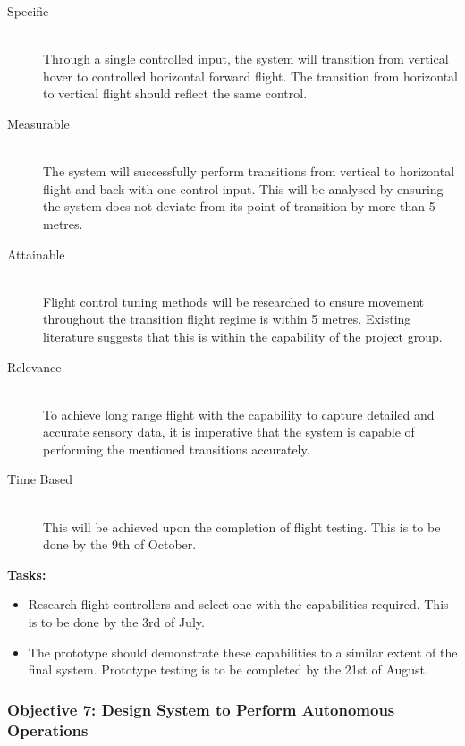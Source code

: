 \begin{appendices}
\begin{description}
    \item[Specific] \hfill \\
    Through a single controlled input, the system will transition from vertical hover to controlled horizontal forward flight. The transition from horizontal to vertical flight should reflect the same control. 
    \item[Measurable] \hfill \\ 
    The system will successfully perform transitions from vertical to horizontal flight and back with one control input. This will be analysed by ensuring the system does not deviate from its point of transition by more than 5 metres.
    \item[Attainable] \hfill \\
    Flight control tuning methods will be researched to ensure movement throughout the transition flight regime is within 5 metres. Existing literature suggests that this is within the capability of the project group.
    \item[Relevance] \hfill \\
    To achieve long range flight with the capability to capture detailed and accurate sensory data, it is imperative that the system is capable of performing the mentioned transitions accurately. 
    \item[Time Based] \hfill \\
    This will be achieved upon the completion of flight testing. This is to be done by the 9th of October.
\end{description}

\textbf{Tasks:}
\begin{itemize}
    \item Research flight controllers and select one with the capabilities required. This is to be done by the 3rd of July.
    \item The prototype should demonstrate these capabilities to a similar extent of the final system. Prototype testing is to be completed by the 21st of August.
\end{itemize}

\subsubsection{Objective 7: Design System to Perform Autonomous Operations}


\end{appendices}
